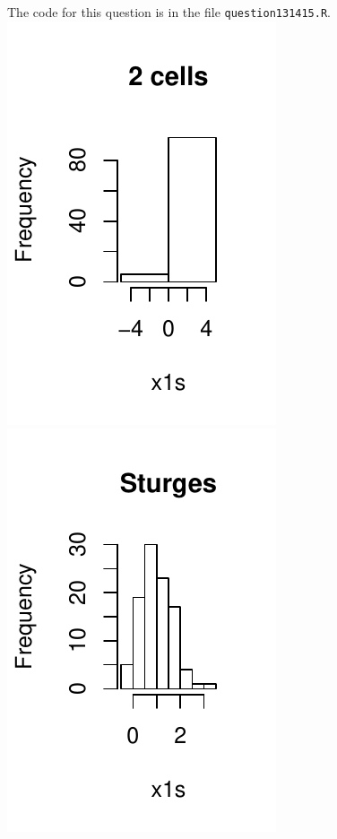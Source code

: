 \documentclass[a4paper, oneside, final]{memoir}
\begin{document}
The code for this question is in the file \texttt{question131415.R}.\\
\includegraphics{img/question15-plot-1-a.pdf}
\includegraphics{img/question15-plot-1-b.pdf}
\end{document}
